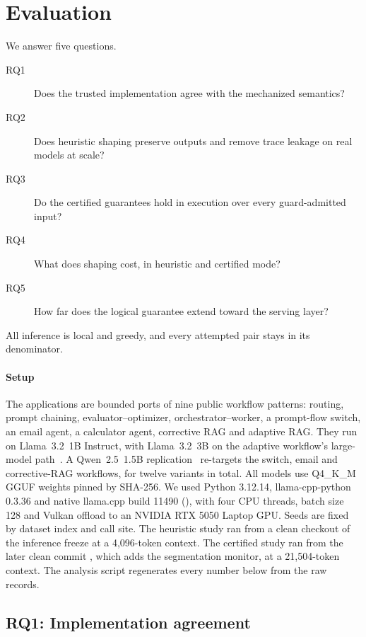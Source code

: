 \section{Evaluation}\label{sec:evaluation}

We answer five questions.
\begin{description}
\item[RQ1] Does the trusted implementation agree with the mechanized semantics?
\item[RQ2] Does heuristic shaping preserve outputs and remove trace leakage on real models at scale?
\item[RQ3] Do the certified guarantees hold in execution over every guard-admitted input?
\item[RQ4] What does shaping cost, in heuristic and certified mode?
\item[RQ5] How far does the logical guarantee extend toward the serving layer?
\end{description}
All inference is local and greedy, and every attempted pair stays in its
denominator.

\paragraph{Setup}
The applications are bounded ports of nine public workflow patterns: routing,
prompt chaining, evaluator--optimizer, orchestrator--worker, a prompt-flow switch,
an email agent, a calculator agent, corrective RAG and adaptive RAG. They run on
Llama~3.2~1B Instruct, with Llama~3.2~3B on the adaptive workflow's large-model
path~\cite{meta2024llama32}. A Qwen~2.5~1.5B replication~\cite{qwen2024qwen25}
re-targets the switch, email and corrective-RAG workflows, for twelve variants in
total. All models use Q4\_K\_M GGUF weights pinned by SHA-256. We used Python 3.12.14,
llama-cpp-python 0.3.36 and native llama.cpp build 11490 (), with
four CPU threads, batch size 128 and Vulkan offload to an NVIDIA RTX 5050 Laptop
GPU. Seeds are fixed by dataset index and call site. The heuristic study ran from
a clean checkout of the inference freeze  at a 4,096-token context.
The certified study ran from the later clean commit , which adds the
segmentation monitor, at a 21,504-token context. The analysis script
 regenerates every number below from the raw
records.

\subsection{RQ1: Implementation agreement}\label{sec:rq1}


